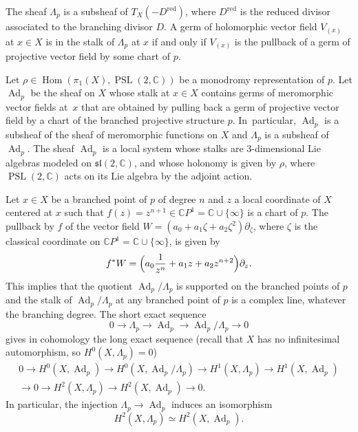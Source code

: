 \documentclass[10pt]{amsart}
\newcommand{\C}{\mathbb C}
\newcommand{\CP}{\mathbb CP}
\newcommand{\red}{\mathrm{red}}
\DeclareMathOperator{\Ad}{Ad}
\DeclareMathOperator{\Hom}{Hom}
\DeclareMathOperator{\PSL}{PSL}
\theoremstyle{definition}
\theoremstyle{plain}
\begin{document}
The sheaf $\Lambda_p$ is a subsheaf of $T_X\left(-D^{\red}\right)$, where $D^{\red}$ is the reduced divisor associated to the branching divisor $D$.
A germ of holomorphic vector field $V_{(x)}$ at $x \in X$ is in the stalk of $\Lambda_p$ at $x$ if and only if $V_{(x)}$ is the pullback of a germ of projective vector field by some chart of $p$.

Let $\rho \in \Hom(\pi_1(X), \PSL(2, \C))$ be a monodromy representation of $p$.
Let $\Ad_p$ be the sheaf on $X$ whose stalk at $x \in X$ contains germs of meromorphic vector fields at~$x$ that are obtained by pulling back a germ of projective vector field by a chart of the branched projective structure $p$. In~particular, $\Ad_p$ is a subsheaf of the sheaf of meromorphic functions on $X$ and $\Lambda_p$ is a subsheaf of $\Ad_p$.
The sheaf $\Ad_p$ is a local system whose stalks are $3$-dimensional Lie algebras modeled on $\mathfrak{sl}(2, \C)$, and whose holonomy is given by $\rho$, where $\PSL(2, \C)$ acts on its Lie algebra by the adjoint action.

Let $x \in X$ be a branched point of $p$ of degree $n$ and $z$ a local coordinate of $X$ centered at $x$ such that $f(z) = z^{n+1} \in \CP^1 = \C \cup \{\infty\}$ is a chart of $p$.
The pullback by $f$ of the vector field $W = \left(a_0 + a_1 \zeta + a_2 \zeta^2\right) \partial_{\zeta}$, where $\zeta$ is the classical coordinate on $\CP^1 = \C \cup \{\infty\}$, is given by
\begin{equation*}
f^*W = \Bigl(a_0\frac 1 {z^n} + a_1 z + a_2 z^{n+2}\Bigr) \partial_z.
\end{equation*}
This implies that the quotient $\Ad_p / \Lambda_p$ is supported on the branched points of $p$ and the stalk of $\Ad_p / \Lambda_p$ at any branched point of $p$ is a complex line, whatever the branching degree.
The short exact sequence
\begin{equation*}
0 \to \Lambda_p \to \Ad_p \to \Ad_p / \Lambda_p \to 0
\end{equation*}
gives in cohomology the long exact sequence (recall that $X$ has no infinitesimal \hbox{automorphism}, so $H^0\left(X, \Lambda_p\right) = 0$)\vspace*{-3pt}
\begin{multline}\label{eq_exact_autom_local_syst}
0 \to H^0\left(X, \Ad_p\right) \to H^0\left(X, \Ad_p / \Lambda_p\right) \to H^1\left(X, \Lambda_p\right) \to H^1\left(X, \Ad_p\right)\\
\to 0 \to H^2\left(X, \Lambda_p\right) \to H^2\left(X, \Ad_p\right) \to 0.
\end{multline}
In particular, the injection $\Lambda_p \to \Ad_p$ induces an isomorphism
\[
H^2(X, \Lambda_p) \simeq H^2(X, \Ad_p).
\]
\end{document}

